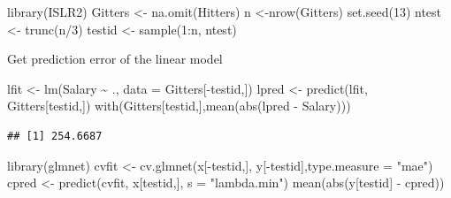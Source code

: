 \documentclass[
]{book}
\newenvironment{Shaded}{\begin{snugshade}}{\end{snugshade}}
\newcommand{\AttributeTok}[1]{\textcolor[rgb]{0.77,0.63,0.00}{#1}}
\newcommand{\DecValTok}[1]{\textcolor[rgb]{0.00,0.00,0.81}{#1}}
\newcommand{\FunctionTok}[1]{\textcolor[rgb]{0.00,0.00,0.00}{#1}}
\newcommand{\NormalTok}[1]{#1}
\newcommand{\OtherTok}[1]{\textcolor[rgb]{0.56,0.35,0.01}{#1}}
\newcommand{\SpecialCharTok}[1]{\textcolor[rgb]{0.00,0.00,0.00}{#1}}
\newcommand{\StringTok}[1]{\textcolor[rgb]{0.31,0.60,0.02}{#1}}
\begin{document}
\begin{Shaded}
\begin{Highlighting}[]
\FunctionTok{library}\NormalTok{(ISLR2)}
\NormalTok{Gitters }\OtherTok{\textless{}{-}} \FunctionTok{na.omit}\NormalTok{(Hitters)}
\NormalTok{n }\OtherTok{\textless{}{-}}\FunctionTok{nrow}\NormalTok{(Gitters)}
\FunctionTok{set.seed}\NormalTok{(}\DecValTok{13}\NormalTok{)}
\NormalTok{ntest }\OtherTok{\textless{}{-}} \FunctionTok{trunc}\NormalTok{(n}\SpecialCharTok{/}\DecValTok{3}\NormalTok{)}
\NormalTok{testid }\OtherTok{\textless{}{-}} \FunctionTok{sample}\NormalTok{(}\DecValTok{1}\SpecialCharTok{:}\NormalTok{n, ntest)}
\end{Highlighting}
\end{Shaded}

Get prediction error of the linear model

\begin{Shaded}
\begin{Highlighting}[]
\NormalTok{lfit }\OtherTok{\textless{}{-}} \FunctionTok{lm}\NormalTok{(Salary }\SpecialCharTok{\textasciitilde{}}\NormalTok{ ., }\AttributeTok{data =}\NormalTok{ Gitters[}\SpecialCharTok{{-}}\NormalTok{testid,])}
\NormalTok{lpred }\OtherTok{\textless{}{-}} \FunctionTok{predict}\NormalTok{(lfit, Gitters[testid,])}
\FunctionTok{with}\NormalTok{(Gitters[testid,],}\FunctionTok{mean}\NormalTok{(}\FunctionTok{abs}\NormalTok{(lpred }\SpecialCharTok{{-}}\NormalTok{ Salary)))}
\end{Highlighting}
\end{Shaded}

\begin{verbatim}
## [1] 254.6687
\end{verbatim}

\begin{Shaded}
\end{Shaded}

\begin{Shaded}
\begin{Highlighting}[]
\FunctionTok{library}\NormalTok{(glmnet)}
\NormalTok{cvfit }\OtherTok{\textless{}{-}} \FunctionTok{cv.glmnet}\NormalTok{(x[}\SpecialCharTok{{-}}\NormalTok{testid,], y[}\SpecialCharTok{{-}}\NormalTok{testid],}\AttributeTok{type.measure =} \StringTok{"mae"}\NormalTok{)}
\NormalTok{cpred }\OtherTok{\textless{}{-}} \FunctionTok{predict}\NormalTok{(cvfit, x[testid,], }\AttributeTok{s =} \StringTok{"lambda.min"}\NormalTok{)}
\FunctionTok{mean}\NormalTok{(}\FunctionTok{abs}\NormalTok{(y[testid] }\SpecialCharTok{{-}}\NormalTok{ cpred))}
\end{Highlighting}
\end{Shaded}
\end{document}
